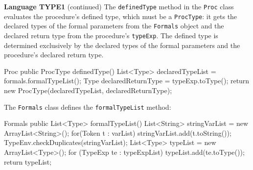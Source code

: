 \begin{minipage}[t]{\sw}
\slidenumber
\LARGE
{\bf Language TYPE1} (continued)\exx
\Large
The \verb'definedType' method in the \verb'Proc' class
evaluates the procedure's defined type, which must be a \verb'ProcType':
it gets the declared types of the formal parameters
from the \verb'Formals' object
and the declared return type
from the procedure's \verb'typeExp'.
The defined type is determined exclusively by the declared types
of the formal parameters and the procedure's declared return type.
\large
\begin{qv}
Proc
    public ProcType definedType() {
        List<Type> declaredTypeList = formals.formalTypeList();
        Type declaredReturnType = typeExp.toType();
        return new ProcType(declaredTypeList, declaredReturnType);
    }
\end{qv}
\Large
The \verb'Formals' class defines the \verb'formalTypeList' method:
\large
\begin{qv}
Formals
    public List<Type> formalTypeList() {
        List<String> stringVarList = new ArrayList<String>();
        for(Token t : varList) {
            stringVarList.add(t.toString());
        }
        TypeEnv.checkDuplicates(stringVarList);
        List<Type> typeList = new ArrayList<Type>();
        for (TypeExp te : typeExpList)
            typeList.add(te.toType());
        return typeList;
    }
\end{qv}
\end{minipage}
